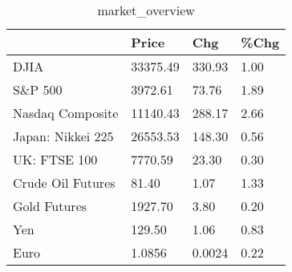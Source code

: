 \documentclass{article}%
\begin{document}
%


\begin{table}[htbp]%
\caption{market\_overview}%
\centering%
\begin{adjustbox}{width=1\textwidth}%
\begin{tabular}{llll}
\toprule
                  &    Price &    Chg & \%Chg \\
\midrule
             DJIA & 33375.49 & 330.93 & 1.00 \\
          S\&P 500 &  3972.61 &  73.76 & 1.89 \\
 Nasdaq Composite & 11140.43 & 288.17 & 2.66 \\
Japan: Nikkei 225 & 26553.53 & 148.30 & 0.56 \\
     UK: FTSE 100 &  7770.59 &  23.30 & 0.30 \\
Crude Oil Futures &    81.40 &   1.07 & 1.33 \\
     Gold Futures &  1927.70 &   3.80 & 0.20 \\
              Yen &   129.50 &   1.06 & 0.83 \\
             Euro &   1.0856 & 0.0024 & 0.22 \\
\bottomrule
\end{tabular}
%
\end{adjustbox}%
\end{table}

%
\end{document}
